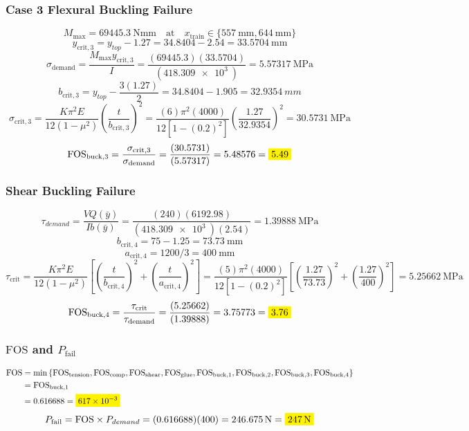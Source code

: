 \documentclass[11pt, fleqn]{article}
\newcommand{\mathhl}[1]{\colorbox{yellow}{$\displaystyle #1$}}
\begin{document}
\subsubsection{Case 3 Flexural Buckling Failure}
\[ M_{\mathrm{max}} = \SI{69445.3}{\N\mm} \quad \text{at} \quad x_{\mathrm{train}} \in \{\SI{557}{\mm},\SI{644}{\mm}\} \]
\[ y_{\mathrm{crit,3}} = y_{top}-1.27 = 34.8404-2.54 = \SI{33.5704}{\mm} \]
\[ \sigma_{\mathrm{demand}} = \frac{M_{\mathrm{max}}y_{\mathrm{crit,3}}}{I} = \frac{(69445.3)(33.5704)}{(\SI{418.309e3}{})} = \SI{5.57317}{\MPa} \]
\[ b_{\mathrm{crit,3}} = y_{top}-\frac{3(1.27)}{2} = 34.8404-1.905 = \SI{32.9354}{mm} \]
\[ \sigma_{\mathrm{crit,3}} = \frac{K\pi^2E}{12\left(1-\mu^2\right)}\left(\frac{t}{b_{\mathrm{crit,3}}}\right)^2 = \frac{\left(6\right)\pi^2\left(4000\right)}{12\left[1-\left(0.2\right)^2\right]}\left(\frac{1.27}{32.9354}\right)^2 = \SI{30.5731}{\MPa} \]
\[ {\mathrm{FOS}}_{\mathrm{buck,3}} = \frac{\sigma_{\mathrm{crit,3}}}{\sigma_{\mathrm{demand}}} = \frac{(30.5731)}{(5.57317)} = 5.48576 = \mathhl{5.49} \]

\subsubsection{Shear Buckling Failure}
\[ \tau_{demand} = \frac{VQ(\bar{y})}{Ib(\bar{y})} = \frac{(240)(6192.98)}{(\SI{418.309e3}{})(2.54)} = \SI{1.39888}{\MPa} \]
\[ b_{\mathrm{crit,4}} = 75-1.25 = \SI{73.73}{\mm} \]
\[ a_{\mathrm{crit,4}} = 1200/3 = \SI{400}{\mm} \]
\[ \tau_{\mathrm{crit}} = \frac{K\pi^2E}{12\left(1-\mu^2\right)}\left[\left(\frac{t}{b_{\mathrm{crit,4}}}\right)^2+\left(\frac{t}{a_{\mathrm{crit,4}}}\right)^2\right] = \frac{\left(5\right)\pi^2\left(4000\right)}{12\left[1-\left(0.2\right)^2\right]}\left[\left(\frac{1.27}{73.73}\right)^2+\left(\frac{1.27}{400}\right)^2\right] = \SI{5.25662}{\MPa} \]
\[ {\mathrm{FOS}}_{\mathrm{buck,4}} = \frac{\tau_{\mathrm{crit}}}{\tau_{\mathrm{demand}}} = \frac{(5.25662)}{(1.39888)} = 3.75773 = \mathhl{3.76} \]

\subsubsection{$\mathrm{FOS}$ and $P_{\mathrm{fail}}$}
\begin{align*}
    \mathrm{FOS} & = \mathrm{min}\left\{{\mathrm{FOS}}_{\mathrm{tension}},{\mathrm{FOS}}_{\mathrm{comp}},{\mathrm{FOS}}_{\mathrm{shear}},{\mathrm{FOS}}_{\mathrm{glue}},{\mathrm{FOS}}_{\mathrm{buck,1}},{\mathrm{FOS}}_{\mathrm{buck,2}},{\mathrm{FOS}}_{\mathrm{buck,3}},{\mathrm{FOS}}_{\mathrm{buck,4}}\right\} \\
                 & = {\mathrm{FOS}}_{\mathrm{buck,1}}                                                                                                                                                                                                                                                               \\
                 & = 0.616688 = \mathhl{\SI{617e-3}{}}
\end{align*}
\[ P_{\mathrm{fail}} = \mathrm{FOS}\times{P}_{demand} = (0.616688)(400) = \SI{246.675}{\N} = \mathhl{\SI{247}{\N}} \]
\end{document}
